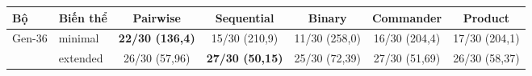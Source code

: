 \begin{tabular}{llccccc}
\toprule
Bộ & Biến thể & Pairwise & Sequential & Binary & Commander & Product \\
\midrule
\multirow{2}{*}{Gen-36} & minimal & \textbf{22/30 (136,4)} & 15/30 (210,9) & 11/30 (258,0) & 16/30 (204,4) & 17/30 (204,1) \\
 & extended & 26/30 (57,96) & \textbf{27/30 (50,15)} & 25/30 (72,39) & 27/30 (51,69) & 26/30 (58,37) \\
\bottomrule
\end{tabular}
